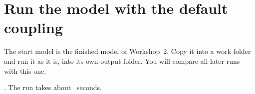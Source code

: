 \section{Run the model with the default coupling}

The start model is the finished model of Workshop~2. Copy it into a work folder and run it as it is, into its own output
folder. You will compare all later runs with this one.
\see {}. The run takes about ~seconds.
